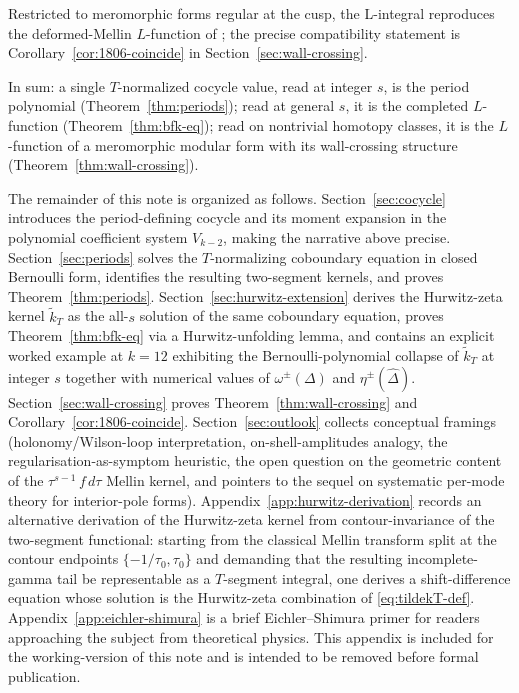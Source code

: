 \documentclass[11pt]{article}
\numberwithin{equation}{section}  %
\newcommand{\Dhat}{\widehat{\Delta}}
\begin{document}
Restricted to meromorphic forms regular at the cusp, the L-integral
reproduces the deformed-Mellin $L$-function of \cite{1806}; the precise
compatibility statement is Corollary~\ref{cor:1806-coincide} in
Section~\ref{sec:wall-crossing}.

In sum: a single $T$-normalized cocycle value, read at integer $s$, is
the period polynomial (Theorem~\ref{thm:periods}); read at general $s$,
it is the completed $L$-function (Theorem~\ref{thm:bfk-eq}); read on
nontrivial homotopy classes, it is the $L$-function of a meromorphic
modular form with its wall-crossing structure
(Theorem~\ref{thm:wall-crossing}).

The remainder of this note is organized as follows.
Section~\ref{sec:cocycle} introduces the period-defining cocycle and its
moment expansion in the polynomial coefficient system $V_{k-2}$, making
the narrative above precise.  Section~\ref{sec:periods} solves the
$T$-normalizing coboundary equation in closed Bernoulli form, identifies
the resulting two-segment kernels, and proves Theorem~\ref{thm:periods}.
Section~\ref{sec:hurwitz-extension} derives the Hurwitz-zeta kernel
$\widetilde{k}_T$ as the all-$s$ solution of the same coboundary
equation, proves Theorem~\ref{thm:bfk-eq} via a Hurwitz-unfolding lemma,
and contains an explicit worked example at $k = 12$ exhibiting the
Bernoulli-polynomial collapse of $\widetilde{k}_T$ at integer $s$
together with numerical values of $\omega^\pm(\Delta)$ and
$\eta^\pm(\Dhat)$.  Section~\ref{sec:wall-crossing} proves
Theorem~\ref{thm:wall-crossing} and Corollary~\ref{cor:1806-coincide}.
Section~\ref{sec:outlook} collects conceptual framings
(holonomy/Wilson-loop interpretation, on-shell-amplitudes analogy, the
regularisation-as-symptom heuristic, the open question on the geometric
content of the $\tau^{s-1}\,f\,d\tau$ Mellin kernel, and pointers to the
sequel on systematic per-mode theory for interior-pole forms).
Appendix~\ref{app:hurwitz-derivation} records an alternative derivation
of the Hurwitz-zeta kernel from contour-invariance of the two-segment
functional: starting from the classical Mellin transform split at the
contour endpoints $\{-1/\tau_0, \tau_0\}$ and demanding that the
resulting incomplete-gamma tail be representable as a $T$-segment
integral, one derives a shift-difference equation whose solution is the
Hurwitz-zeta combination of \eqref{eq:tildekT-def}.
Appendix~\ref{app:eichler-shimura} is a brief Eichler--Shimura primer for
readers approaching the subject from theoretical physics.  This appendix
is included for the working-version of this note and is intended to be
removed before formal publication.
\end{document}
